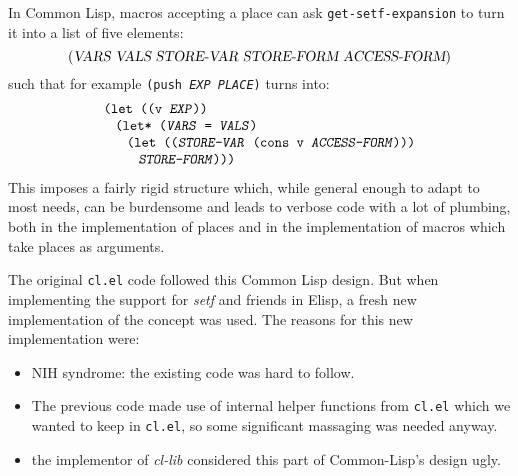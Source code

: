 \documentclass[format=acmsmall, review=false, screen=true]{acmart}
\makeatletter
\newcommand \Elisp {Elisp}
\newcommand \MAlign [1] {\begin{array}{@{}l@{}}#1\end{array}}
\makeatother
\begin{document}
In Common Lisp, macros accepting a place can ask \texttt{get-setf-expansion}
to turn it into a list of five elements:
\begin{displaymath}
  (\textsl{VARS}~\textsl{VALS}~\textsl{STORE-VAR}~\textsl{STORE-FORM}
  ~\textsl{ACCESS-FORM})
\end{displaymath}
such that for example \texttt{(push \textsl{EXP} \textsl{PLACE})} turns into:
\begin{displaymath}
  \MAlign{
    \texttt{(let ((v \textsl{EXP}))} \\
    \;\;\;\MAlign{
      \texttt{(let* (\textsl{VARS} = \textsl{VALS})} \\
      \;\;\;\MAlign{
        \texttt{(let ((\textsl{STORE-VAR} (cons v \textsl{ACCESS-FORM})))} \\
        \;\;\;\texttt{\textsl{STORE-FORM})))}}}}
\end{displaymath}
This imposes a fairly rigid structure which, while general enough to adapt
to most needs, can be burdensome and leads to verbose code with a lot
of plumbing, both in the implementation of places and in the implementation
of macros which take places as arguments.

The original \texttt{cl.el} code followed this Common Lisp design.  But when
implementing the support for \emph{setf} and friends in \Elisp{}, a fresh
new implementation of the concept was used.  The reasons for this new
implementation were:
\begin{itemize}
\item NIH syndrome: the existing code was hard to follow.
\item The previous code made use of internal helper functions from
  \texttt{cl.el} which we wanted to keep in \texttt{cl.el}, so some
  significant massaging was needed anyway.
\item the implementor of \emph{cl-lib} considered this part of Common-Lisp's
  design ugly.
\end{itemize}
\end{document}
